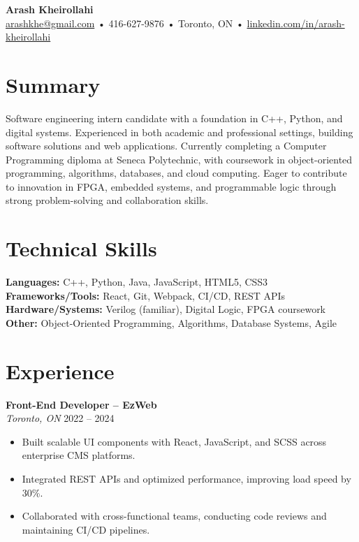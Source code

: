 \documentclass[letterpaper,10pt]{article}
\begin{document}

{\LARGE \textbf{Arash Kheirollahi}}\\
\href{mailto:arashkhe@gmail.com}{arashkhe@gmail.com} • 416-627-9876 • Toronto, ON • \href{https://linkedin.com/in/arash-kheirollahi}{linkedin.com/in/arash-kheirollahi}

\vspace{1em}

\section*{Summary}
Software engineering intern candidate with a foundation in C++, Python, and digital systems. Experienced in both academic and professional settings, building software solutions and web applications. Currently completing a Computer Programming diploma at Seneca Polytechnic, with coursework in object-oriented programming, algorithms, databases, and cloud computing. Eager to contribute to innovation in FPGA, embedded systems, and programmable logic through strong problem-solving and collaboration skills.

\section*{Technical Skills}
\textbf{Languages:} C++, Python, Java, JavaScript, HTML5, CSS3 \\
\textbf{Frameworks/Tools:} React, Git, Webpack, CI/CD, REST APIs \\
\textbf{Hardware/Systems:} Verilog (familiar), Digital Logic, FPGA coursework \\
\textbf{Other:} Object-Oriented Programming, Algorithms, Database Systems, Agile

\section*{Experience}
\textbf{Front-End Developer – EzWeb}\\
\textit{Toronto, ON} \hfill 2022 -- 2024
\begin{itemize}[leftmargin=*]
  \item Built scalable UI components with React, JavaScript, and SCSS across enterprise CMS platforms.
  \item Integrated REST APIs and optimized performance, improving load speed by 30\%.
  \item Collaborated with cross-functional teams, conducting code reviews and maintaining CI/CD pipelines.
\end{itemize}
\end{document}
